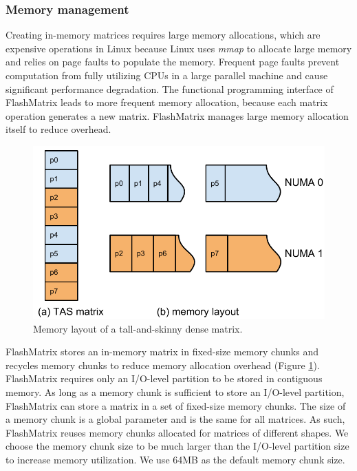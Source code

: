 \subsubsection{Memory management} \label{sec:mem}
Creating in-memory matrices requires large memory allocations, which are
expensive operations in Linux because Linux uses \textit{mmap} to allocate
large memory and relies on page faults to populate the memory. Frequent page
faults prevent computation from fully utilizing CPUs in a large parallel
machine and cause significant performance degradation. The functional
programming interface of FlashMatrix leads to more frequent memory allocation,
because each matrix operation generates a new matrix. 
FlashMatrix manages large memory allocation itself to reduce overhead.

\begin{figure}
	\centering
	\includegraphics[scale=0.5]{FlashMatrix_figs/matrix_mem.pdf}
	\caption{Memory layout of a tall-and-skinny dense matrix.}
	\label{fig:mat_mem}
\end{figure}

FlashMatrix stores an in-memory matrix in fixed-size memory chunks and
recycles memory chunks to reduce memory allocation overhead (Figure
\ref{fig:mat_mem}). FlashMatrix requires only an I/O-level partition to
be stored in contiguous memory. As long as a memory chunk is sufficient
to store an I/O-level partition, FlashMatrix can store a matrix in a set
of fixed-size memory chunks. The size of a memory chunk is a global parameter
and is the same for all matrices. As such, FlashMatrix reuses memory chunks
allocated for matrices of different shapes. 
We choose the memory chunk
size to be much larger than the I/O-level partition size to increase
memory utilization. We use 64MB as the default memory chunk size.


